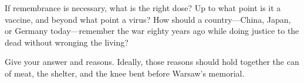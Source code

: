 If remembrance is necessary, what is the right dose? Up to what point is it a vaccine, and beyond what point a virus? How should a country---China, Japan, or Germany today---remember the war eighty years ago while doing justice to the dead without wronging the living?

Give your answer and reasons. Ideally, those reasons should hold together the can of meat, the shelter, and the knee bent before Warsaw's memorial.
